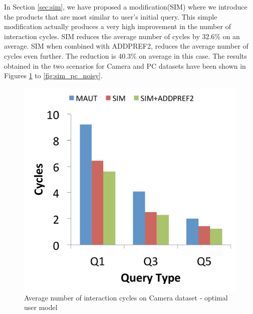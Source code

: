 In Section \ref{sec:sim}, we have proposed a modification(SIM) where we introduce the products that are most similar to user's initial query.
This simple modification actually produces a very high improvement in the number of interaction cycles.
SIM reduces the average number of cycles by 32.6\% on an average.
SIM when combined with ADDPREF2, reduces the average number of cycles even further. 
The reduction is 40.3\% on average in this case.
The results obtained in the two scenarios for Camera and PC datasets have been shown in Figures \ref{fig:sim_camera_opt} to \ref{fig:sim_pc_noisy}.

\begin{figure}[h]
\centering
\begin{minipage}{.45\textwidth}
  \centering
  \includegraphics[width=1\linewidth]{figures-bharath/sim_camera_opt}
  \caption[]{Average number of interaction cycles on Camera dataset - optimal user model}
  \label{fig:sim_camera_opt}
\end{minipage}%
\;\;\;\;\;\;
\begin{minipage}{.45\textwidth}
  \centering

\end{minipage}
\end{figure}
